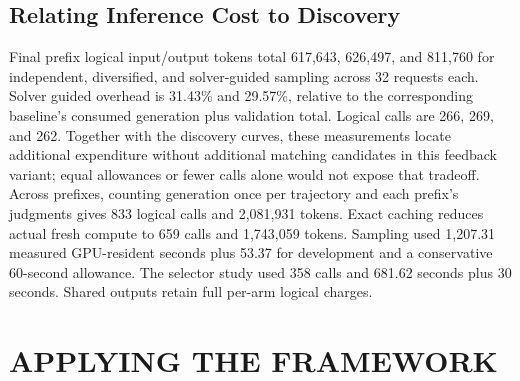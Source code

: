 \documentclass[a4paper,twoside]{article}
\begin{document}
\subsection{Relating Inference Cost to Discovery}

Final prefix logical input/output tokens total 617,643, 626,497, and 811,760 for independent, diversified, and solver-guided sampling across 32 requests each. Solver guided overhead is 31.43\% and 29.57\%, relative to the corresponding baseline's consumed generation plus validation total. Logical calls are 266, 269, and 262. Together with the discovery curves, these measurements locate additional expenditure without additional matching candidates in this feedback variant; equal allowances or fewer calls alone would not expose that tradeoff.
Across prefixes, counting generation once per trajectory and each prefix's judgments gives 833 logical calls and 2,081,931 tokens. Exact caching reduces actual fresh compute to 659 calls and 1,743,059 tokens. Sampling used 1,207.31 measured GPU-resident seconds plus 53.37 for development and a conservative 60-second allowance. The selector study used 358 calls and 681.62 seconds plus 30 seconds. Shared outputs retain full per-arm logical charges.



\section{\uppercase{Applying the Framework}}
\label{sec:recommendations}
\end{document}
